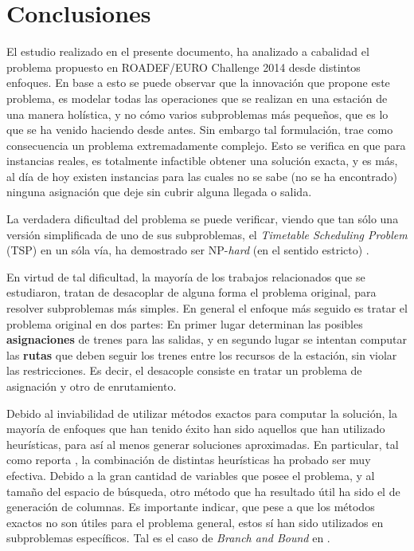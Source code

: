 \documentclass[letter, 10pt]{article}
\begin{document}
\section{Conclusiones} \label{conclusions}

El estudio realizado en el presente documento, ha analizado a cabalidad el problema propuesto en ROADEF/EURO Challenge 2014 desde distintos enfoques. En base a esto se puede observar que la innovación que propone este problema, es modelar todas las operaciones que se realizan en una estación de una manera holística, y no cómo varios subproblemas más pequeños, que es lo que se ha venido haciendo desde antes. Sin embargo tal formulación, trae como consecuencia un problema extremadamente complejo. Esto se verifica en que para instancias reales, es totalmente infactible obtener una solución exacta, y es más, al día de hoy existen instancias para las cuales no se sabe (no se ha encontrado) ninguna asignación que deje sin cubrir alguna llegada o salida.

La verdadera dificultad del problema se puede verificar, viendo que tan sólo una versión simplificada de uno de sus subproblemas, el \textit{Timetable Scheduling Problem} (TSP) en un sóla vía, ha demostrado ser NP-\textit{hard} (en el sentido estricto) \cite{Caprara}.

En virtud de tal dificultad, la mayoría de los trabajos relacionados que se estudiaron, tratan de desacoplar de alguna forma el problema original, para resolver subproblemas más simples. En general el enfoque más seguido es tratar el problema original en dos partes: En primer lugar determinan las posibles \textbf{asignaciones} de trenes para las salidas, y en segundo lugar se intentan computar las \textbf{rutas} que deben seguir los trenes entre los recursos de la estación, sin violar las restricciones. Es decir, el desacople consiste en tratar un problema de asignación y otro de enrutamiento.

Debido al inviabilidad de utilizar métodos exactos para computar la solución, la mayoría de enfoques que han tenido éxito han sido aquellos que han utilizado heurísticas, para así al menos generar soluciones aproximadas. En particular, tal como reporta \cite{Higgins}, la combinación de distintas heurísticas ha probado ser muy efectiva.  Debido a la gran cantidad de variables que posee el problema, y al tamaño del espacio de búsqueda, otro método que ha resultado útil ha sido el de generación de columnas. Es importante indicar, que pese a que los métodos exactos no son útiles para el problema general, estos sí han sido utilizados en subproblemas específicos. Tal es el caso de \textit{Branch and Bound} en \cite{DAriano}.
\end{document}
